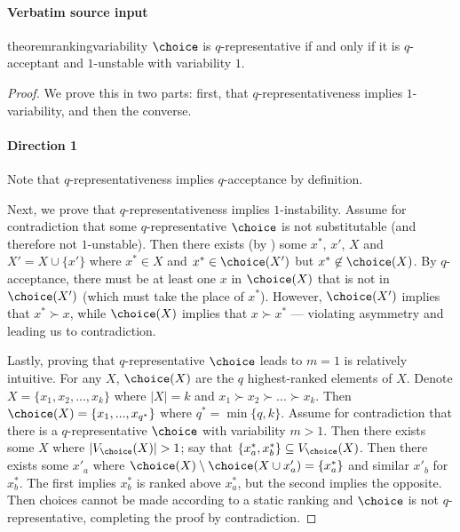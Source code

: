 \documentclass[10pt]{article}
\begin{document}
\paragraph{Verbatim source input}
\begin{ReviewVerbatim}
\begin{restatable}{theorem}{rankingvariability}
\label{thm:ranking-variability}
$\choice$ is $q$-representative if and only if it is $q$-acceptant and $1$-unstable with variability $1$.
\end{restatable}
\begin{proof}
We prove this in two parts: first, that $q$-representativeness implies $1$-variability, and then the converse.

\paragraph{Direction 1} %
Note that $q$-representativeness implies $q$-acceptance by definition.

Next, we prove that $q$-representativeness implies $1$-instability. Assume for contradiction that some $q$-representative $\choice$ is not substitutable (and therefore not $1$-unstable). Then there exists (by ) some $x^*$, $x'$, $X$ and $X' = X \cup \{x'\}$ where $x^* \in X$ and $x^* \in \choice(X')$ but $x^* \not\in \choice(X)$. By $q$-acceptance, there must be at least one $x$ in $\choice(X)$ that is not in $\choice(X')$ (which must take the place of $x^*$). However, $\choice(X')$ implies that $x^* \succ x$, while $\choice(X)$ implies that $x \succ x^*$ --- violating asymmetry and leading us to contradiction.

Lastly, proving that $q$-representative $\choice$ leads to $m=1$ is relatively intuitive. For any $X$, $\choice(X)$ are the $q$ highest-ranked elements of $X$. Denote $X = \{x_1, x_2, ..., x_k\}$ where $|X| = k$ and $x_1 \succ x_2 \succ ...\succ x_k$. Then $\choice(X) = \{x_1, ..., x_{q^*}\}$ where $q^* = \min\{q, k\}$.
Assume for contradiction that there is a $q$-representative $\choice$ with variability $m > 1$. Then there exists some $X$ where $|V_\choice(X)| > 1$; say that $\{x^*_a, x^*_b\} \subseteq V_\choice(X)$. Then there exists some $x'_a$ where $\choice(X) \setminus \choice(X \cup x'_a) = \{x^*_a\}$ and similar $x'_b$ for $x^*_b$. The first implies $x^*_b$ is ranked above $x^*_a$, but the second implies the opposite. Then choices cannot be made according to a static ranking and $\choice$ is not $q$-representative, completing the proof by contradiction. %


\end{proof}
\end{ReviewVerbatim}
\end{document}
